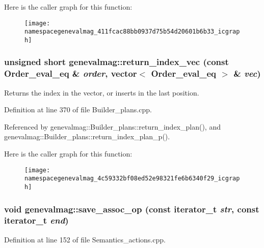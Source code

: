 Here is the caller graph for this function:\nopagebreak
\begin{figure}[H]
\begin{center}
\leavevmode
\texttt{[image: namespacegenevalmag\_411fcac88bb0937d75b54d20601b6b33\_icgraph]}
\end{center}
\end{figure}
\hypertarget{namespacegenevalmag_4c59332bf08ed52e98321fe6b6340f29}{
\subsubsection[{return\_\-index\_\-vec}]{\setlength{\rightskip}{0pt plus 5cm}unsigned short genevalmag::return\_\-index\_\-vec (const Order\_\-eval\_\-eq \& {\em order}, \/  vector$<$ Order\_\-eval\_\-eq $>$ \& {\em vec})}}
\label{namespacegenevalmag_4c59332bf08ed52e98321fe6b6340f29}


Returns the index in the vector, or inserts in the last position. 

Definition at line 370 of file Builder\_\-plans.cpp.

Referenced by genevalmag::Builder\_\-plans::return\_\-index\_\-plan(), and genevalmag::Builder\_\-plans::return\_\-index\_\-plan\_\-p().

Here is the caller graph for this function:\nopagebreak
\begin{figure}[H]
\begin{center}
\leavevmode
\texttt{[image: namespacegenevalmag\_4c59332bf08ed52e98321fe6b6340f29\_icgraph]}
\end{center}
\end{figure}
\hypertarget{namespacegenevalmag_3aa0e95a99ace1f802a226e24366f4fb}{
\subsubsection[{save\_\-assoc\_\-op}]{\setlength{\rightskip}{0pt plus 5cm}void genevalmag::save\_\-assoc\_\-op (const iterator\_\-t {\em str}, \/  const iterator\_\-t {\em end})}}
\label{namespacegenevalmag_3aa0e95a99ace1f802a226e24366f4fb}




Definition at line 152 of file Semantics\_\-actions.cpp.

